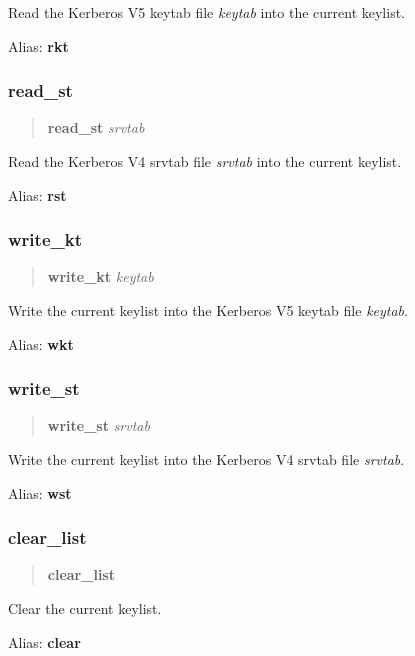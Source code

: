 \documentclass[letterpaper,10pt,english]{sphinxmanual}
\begin{document}
Read the Kerberos V5 keytab file \emph{keytab} into the current keylist.

Alias: \textbf{rkt}


\subsubsection{read\_st}
\label{admin/admin_commands/ktutil:read-st}\begin{quote}

\textbf{read\_st} \emph{srvtab}
\end{quote}

Read the Kerberos V4 srvtab file \emph{srvtab} into the current keylist.

Alias: \textbf{rst}


\subsubsection{write\_kt}
\label{admin/admin_commands/ktutil:write-kt}\begin{quote}

\textbf{write\_kt} \emph{keytab}
\end{quote}

Write the current keylist into the Kerberos V5 keytab file \emph{keytab}.

Alias: \textbf{wkt}


\subsubsection{write\_st}
\label{admin/admin_commands/ktutil:write-st}\begin{quote}

\textbf{write\_st} \emph{srvtab}
\end{quote}

Write the current keylist into the Kerberos V4 srvtab file \emph{srvtab}.

Alias: \textbf{wst}


\subsubsection{clear\_list}
\label{admin/admin_commands/ktutil:clear-list}\begin{quote}

\textbf{clear\_list}
\end{quote}

Clear the current keylist.

Alias: \textbf{clear}
\end{document}
